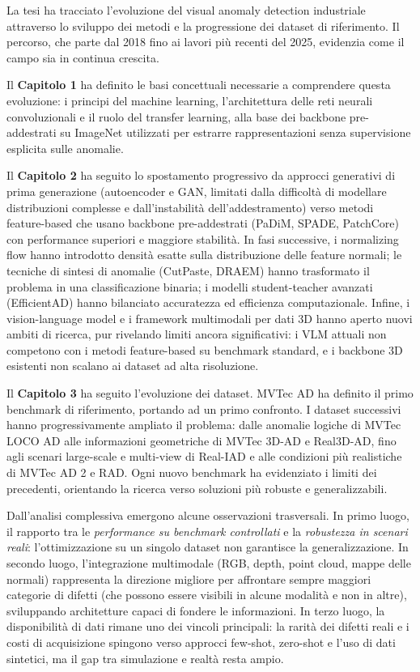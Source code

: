 La tesi ha tracciato l'evoluzione del visual anomaly detection industriale attraverso lo sviluppo dei metodi e la progressione dei dataset di riferimento. Il percorso, che parte dal 2018 fino ai lavori più recenti del 2025, evidenzia come il campo sia in continua crescita.

\medskip

Il \textbf{Capitolo 1} ha definito le basi concettuali necessarie a comprendere questa evoluzione: i principi del machine learning, l'architettura delle reti neurali convoluzionali e il ruolo del transfer learning, alla base dei backbone pre-addestrati su ImageNet utilizzati per estrarre rappresentazioni senza supervisione esplicita sulle anomalie.

\medskip

Il \textbf{Capitolo 2} ha seguito lo spostamento progressivo da approcci generativi di prima generazione (autoencoder e GAN, limitati dalla difficoltà di modellare distribuzioni complesse e dall'instabilità dell'addestramento) verso metodi feature-based che usano backbone pre-addestrati (PaDiM, SPADE, PatchCore) con performance superiori e maggiore stabilità. In fasi successive, i normalizing flow hanno introdotto densità esatte sulla distribuzione delle feature normali; le tecniche di sintesi di anomalie (CutPaste, DRAEM) hanno trasformato il problema in una classificazione binaria; i modelli student-teacher avanzati (EfficientAD) hanno bilanciato accuratezza ed efficienza computazionale. Infine, i vision-language model e i framework multimodali per dati 3D hanno aperto nuovi ambiti di ricerca, pur rivelando limiti ancora significativi: i VLM attuali non competono con i metodi feature-based su benchmark standard, e i backbone 3D esistenti non scalano ai dataset ad alta risoluzione.

\medskip

Il \textbf{Capitolo 3} ha seguito l'evoluzione dei dataset. MVTec AD ha definito il primo benchmark di riferimento, portando ad un primo confronto. I dataset successivi hanno progressivamente ampliato il problema: dalle anomalie logiche di MVTec LOCO AD alle informazioni geometriche di MVTec 3D-AD e Real3D-AD, fino agli scenari large-scale e multi-view di Real-IAD e alle condizioni più realistiche di MVTec AD 2 e RAD. Ogni nuovo benchmark ha evidenziato i limiti dei precedenti, orientando la ricerca verso soluzioni più robuste e generalizzabili.

\medskip

Dall'analisi complessiva emergono alcune osservazioni trasversali. In primo luogo, il rapporto tra le \textit{performance su benchmark controllati} e la \textit{robustezza in scenari reali}: l'ottimizzazione su un singolo dataset non garantisce la generalizzazione. 
In secondo luogo, l'integrazione multimodale (RGB, depth, point cloud, mappe delle normali) rappresenta la direzione migliore per affrontare sempre maggiori categorie di difetti (che possono essere visibili in alcune modalità e non in altre), sviluppando architetture capaci di fondere le informazioni.
In terzo luogo, la disponibilità di dati rimane uno dei vincoli principali: la rarità dei difetti reali e i costi di acquisizione spingono verso approcci few-shot, zero-shot e l'uso di dati sintetici, ma il gap tra simulazione e realtà resta ampio.


